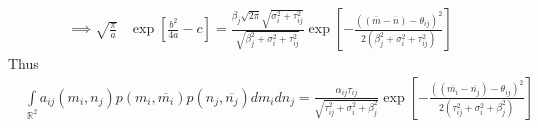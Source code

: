 \documentclass{amsart}
\theoremstyle{definition}
\theoremstyle{remark}
\numberwithin{equation}{section}
\begin{document}
\begin{align*}
	\implies \sqrt{\frac{\pi}{a}}&\exp\left[\frac{b^2}{4a} - c\right] = \frac{\beta_j\sqrt{2\pi}\sqrt{\sigma_i^2 + \tau_{ij}^2}}{\sqrt{\beta_j^2 + \sigma_i^2 + \tau_{ij}^2}}\exp\left[-\frac{((\overline{m} - \overline{n}) - \theta_{ij})^2}{2(\beta_j^2 + \sigma_i^2 + \tau_{ij}^2)}\right]
\end{align*}
Thus
\begin{align*}
	&\int\limits_{\mathbb{R}^2}a_{ij}(m_i, n_j)p(m_i, \overline{m_i})p(n_j, \overline{n_j})dm_idn_j = \frac{\alpha_{ij}\tau_{ij}}{\sqrt{\tau_{ij}^2 + \sigma_i^2 + \beta_j^2}}\exp{\left[-\frac{((\overline{m_i} - \overline{n_j}) - \theta_{ij})^2}{2(\tau_{ij}^2 + \sigma_i^2 + \beta_j^2)}\right]}
\end{align*}
\end{document}
